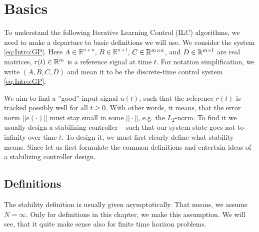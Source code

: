 \chapter{Basics} 
\label{ch:Basics}

To understand the following Iterative Learning Control (ILC) algorithms, we need to make a departure to basic definitions we will use. 
We consider the system \eqref{eq:Intro:GP}. Here $A \in \mathbb{R}^{n\times n}$, $B \in \mathbb{R}^{n \times l}$, $C \in {\mathbb{R}}^{m \times n}$, and $D \in {\mathbb{R}}^{m\times l}$ are real matrices, $r(t) \in {\mathbb{R}}^{m}$ is a reference signal at time $t$. For notation simplification, we write $(A, B,C,D)$ and mean it to be the discrete-time control system \eqref{eq:Intro:GP}.








We aim to find a ''good'' input signal $u(t)$, such that the reference $r(t)$ is tracked possibly well for all $t \geq 0$. With other words, it means, that the error norm $||e(\cdot)||$ must stay small in some  $||\cdot||$, e.g. the $L_2$-norm.
To find it we usually design a stabilizing controller 
 -- such that our system state goes not to infinity over time $t$. 
To design it, we must first clearly define what stability means. Since let us first formulate the common definitions and entertain ideas of a stabilizing controller design. 

\section{Definitions}


The stability definition is usually given asymptotically. That means, we assume $N = \infty$. Only for definitions in this chapter, we make this assumption. We will see, that it quite make sense also for finite time horizon problems.  

